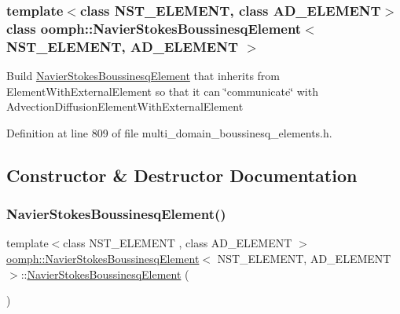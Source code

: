 \subsubsection*{template$<$class N\+S\+T\+\_\+\+E\+L\+E\+M\+E\+NT, class A\+D\+\_\+\+E\+L\+E\+M\+E\+NT$>$\newline
class oomph\+::\+Navier\+Stokes\+Boussinesq\+Element$<$ N\+S\+T\+\_\+\+E\+L\+E\+M\+E\+N\+T, A\+D\+\_\+\+E\+L\+E\+M\+E\+N\+T $>$}

Build \hyperlink{classoomph_1_1NavierStokesBoussinesqElement}{Navier\+Stokes\+Boussinesq\+Element} that inherits from Element\+With\+External\+Element so that it can \char`\"{}communicate\char`\"{} with Advection\+Diffusion\+Element\+With\+External\+Element 

Definition at line 809 of file multi\+\_\+domain\+\_\+boussinesq\+\_\+elements.\+h.



\subsection{Constructor \& Destructor Documentation}
\mbox{\label{classoomph_1_1NavierStokesBoussinesqElement_ad0ebb74a3963c0715e6e3e34ba8b1d7f}} 
\subsubsection{\texorpdfstring{Navier\+Stokes\+Boussinesq\+Element()}{NavierStokesBoussinesqElement()}}
{\footnotesize\ttfamily template$<$class N\+S\+T\+\_\+\+E\+L\+E\+M\+E\+NT , class A\+D\+\_\+\+E\+L\+E\+M\+E\+NT $>$ \\
\hyperlink{classoomph_1_1NavierStokesBoussinesqElement}{oomph\+::\+Navier\+Stokes\+Boussinesq\+Element}$<$ N\+S\+T\+\_\+\+E\+L\+E\+M\+E\+NT, A\+D\+\_\+\+E\+L\+E\+M\+E\+NT $>$\+::\hyperlink{classoomph_1_1NavierStokesBoussinesqElement}{Navier\+Stokes\+Boussinesq\+Element} (\begin{DoxyParamCaption}{ }\end{DoxyParamCaption})\hspace{0.3cm}{\ttfamily [inline]}}



